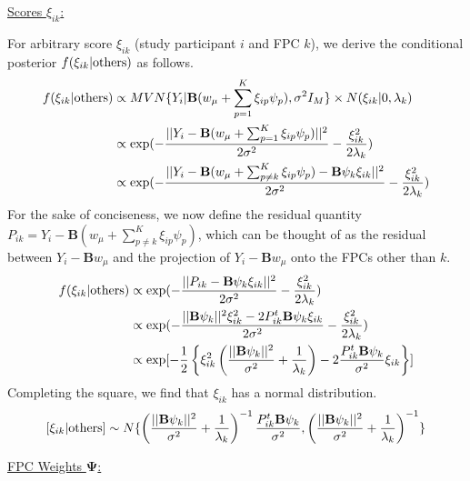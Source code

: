 \documentclass[12pt]{article}
\begin{document}
\vspace{0.5em}
\underline{Scores $\xi_{ik}$:}

For arbitrary score $\xi_{ik}$ (study participant $i$ and FPC $k$), we derive the conditional posterior $f(\xi_{ik}|{\rm others})$ as follows.
\begin{align*}
    f(\xi_{ik}|{\rm others}) & \propto MVN\{Y_i|\mathbf{B}(w_{\mu} + \sum_{p = 1}^K \xi_{ip} \psi_{p}), \sigma^2 I_M\} \times N(\xi_{ik}|0, \lambda_k)\\
    & \propto \exp(-\frac{||Y_i - \mathbf{B}(w_\mu + \sum_{p  =1}^K \xi_{ip} \psi_p)||^2}{2\sigma^2} - \frac{\xi_{ik}^2}{2\lambda_k})\\
    & \propto \exp(-\frac{||Y_i - \mathbf{B}(w_\mu + \sum_{p  \neq k}^K \xi_{ip} \psi_p) - \mathbf{B}\psi_{k} \xi_{ik}||^2}{2\sigma^2} - \frac{\xi_{ik}^2}{2\lambda_k})
\end{align*}
For the sake of conciseness, we now define the residual quantity $P_{ik} = Y_i - \mathbf{B}(w_\mu + \sum_{p  \neq k}^K \xi_{ip} \psi_p)$, which can be thought of as the residual between $Y_i - \mathbf{B}w_\mu$ and the projection of $Y_i - \mathbf{B}w_\mu$ onto the FPCs other than $k$.
\begin{align*}
    f(\xi_{ik}|{\rm others}) & \propto \exp(-\frac{||P_{ik} - \mathbf{B}\psi_{k} \xi_{ik}||^2}{2\sigma^2} - \frac{\xi_{ik}^2}{2\lambda_k})\\
    & \propto \exp(-\frac{||\mathbf{B}\psi_{k}||^2 \xi_{ik}^2 - 2P_{ik}^t \mathbf{B}\psi_{k}\xi_{ik}}{2\sigma^2} - \frac{\xi_{ik}^2}{2\lambda_k})\\
    & \propto \exp[-\frac{1}{2}\left\{\xi_{ik}^2\left(\frac{||\mathbf{B}\psi_k||^2}{\sigma^2} + \frac{1}{\lambda_k}\right) - 2\frac{P_{ik}^t \mathbf{B}\psi_k}{\sigma^2}\xi_{ik}\right\}]
\end{align*}
Completing the square, we find that $\xi_{ik}$ has a normal distribution.
$$[\xi_{ik}|{\rm others}] \sim N\{\left(\frac{||\mathbf{B}\psi_k||^2}{\sigma^2} + \frac{1}{\lambda_k}\right)^{-1}\frac{P_{ik}^t \mathbf{B}\psi_k}{\sigma^2}, \left(\frac{||\mathbf{B}\psi_k||^2}{\sigma^2} + \frac{1}{\lambda_k}\right)^{-1}\}$$

\vspace{0.5em}
\underline{FPC Weights $\boldsymbol{\Psi}$:}
\end{document}
